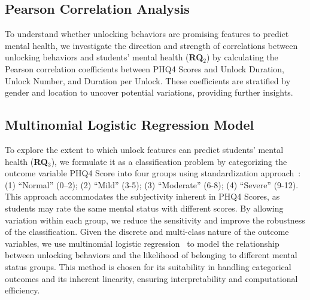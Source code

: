 \subsection{Pearson Correlation Analysis}
\label{sec:data:correlation}
\vspace{-2pt}
To understand whether unlocking behaviors are promising features to predict mental health, we investigate the direction and strength of correlations between unlocking behaviors and students' mental health (\textbf{RQ$_2$}) by calculating the Pearson correlation coefficients between PHQ4 Scores and {Unlock Duration}, {Unlock Number}, and {Duration per Unlock}. These coefficients are stratified by gender and location to uncover potential variations, providing further insights.


\subsection{Multinomial Logistic Regression Model}
\label{sec:data:regression}
\vspace{-2pt}
To explore the extent to which unlock features can predict students' mental health (\textbf{RQ$_3$}), we formulate it as a classification problem by categorizing the outcome variable {PHQ4 Score} into four groups using standardization approach~\cite{wicke2022update}: (1) ``Normal'' (0–2); (2) ``Mild'' (3-5); (3) ``Moderate'' (6-8); (4) ``Severe'' (9-12). This approach accommodates the subjectivity inherent in PHQ4 Scores, as students may rate the same mental status with different scores. By allowing variation within each group, we reduce the sensitivity and improve the robustness of the classification. Given the discrete and multi-class nature of the outcome variables, we use multinomial logistic regression~\cite{bohning1992multinomial} to model the relationship between unlocking behaviors and the likelihood of belonging to different mental status groups. This method is chosen for its suitability in handling categorical outcomes and its inherent linearity, ensuring interpretability and computational efficiency.




